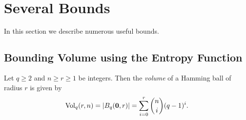 \section{Several Bounds}

In this section we describe numerous useful bounds.

\subsection{Bounding Volume using the Entropy Function}

\begin{definition}
    Let $q\geq 2$ and $n\geq r\geq 1$ be integers. Then the \textit{volume} of a Hamming ball of radius $r$ is given by
    $$\operatorname{Vol}_q(r,n)=|B_q(\textbf{0}, r)|=\sum_{i=0}^r\binom{n}{i}(q-1)^i.$$
\end{definition}

